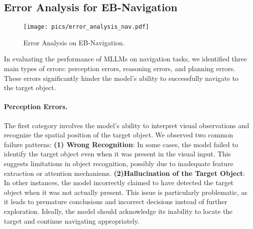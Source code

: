 \subsection{Error Analysis for EB-Navigation}
\begin{figure}[h!]
\begin{center}
\texttt{[image: pics/error\_analysis\_nav.pdf]}
\end{center}
\vspace{-1.5em}
\caption{Error Analysis on EB-Navigation.}
\label{fig:appendix_error_analysis}
\end{figure}
In evaluating the performance of MLLMs on navigation tasks, we identified three main types of errors: perception errors, reasoning errors, and planning errors. These errors significantly hinder the model's ability to successfully navigate to the target object.

\paragraph{Perception Errors.}
The first category involves the model's ability to interpret visual observations and recognize the spatial position of the target object. We observed two common failure patterns:  
\textbf{(1) Wrong Recognition}: In some cases, the model failed to identify the target object even when it was present in the visual input. This suggests limitations in object recognition, possibly due to inadequate feature extraction or attention mechanisms.  
\textbf{(2)Hallucination of the Target Object}: In other instances, the model incorrectly claimed to have detected the target object when it was not actually present. This issue is particularly problematic, as it leads to premature conclusions and incorrect decisions instead of further exploration. Ideally, the model should acknowledge its inability to locate the target and continue navigating appropriately.


